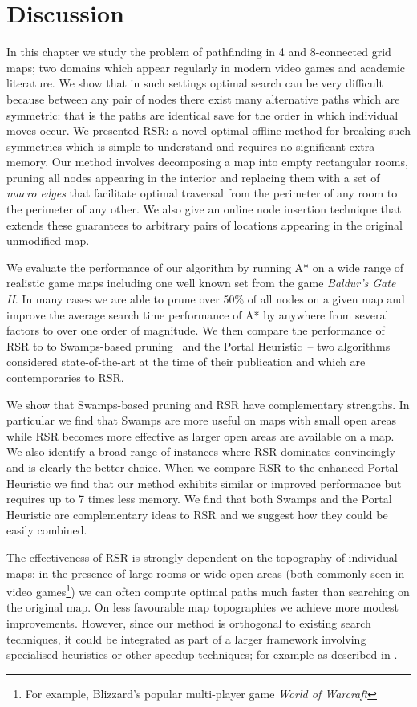 \section{Discussion}
\label{cha::rsr::discussion}
In this chapter we study the problem of pathfinding in 4 and 8-connected grid
maps; two domains which appear regularly in modern video games and academic
literature.  We show that in such settings optimal search can be very
difficult because between any pair of nodes there exist many alternative paths
which are symmetric: that is the paths are identical save for the order in
which individual moves occur.  We presented RSR: a novel optimal offline
method for breaking such symmetries which is simple to understand and requires
no significant extra memory.  Our method involves decomposing a map into empty
rectangular rooms, pruning all nodes appearing in the interior and replacing
them with a set of \emph{macro edges} that facilitate optimal traversal from
the perimeter of any room to the perimeter of any other.  We also give an
online node insertion technique that extends these guarantees
 to arbitrary pairs of locations appearing in the original unmodified map.
\par
We evaluate the performance of our algorithm by running A* on a wide range of
realistic game maps including one well known set from the game \emph{Baldur's
Gate II}.  In many cases we are able to prune over 50\% of all nodes on a
given map and improve the average search time performance of A* by anywhere
from several factors to over one order of magnitude.  We then compare the
performance of RSR to to Swamps-based pruning~\citep{pochter09,pochter11} and
the Portal Heuristic~\citep{goldenberg10}-- two algorithms considered
state-of-the-art at the time of their publication and which are contemporaries
to RSR.

We show that Swamps-based pruning and RSR  have complementary strengths. In
particular we find that Swamps are more useful on maps with small open areas
while RSR becomes more effective as larger open areas are available on a map.
We also identify a broad range of instances where RSR dominates convincingly
and is clearly the better choice.  When we compare RSR to the enhanced Portal
Heuristic we find that our method exhibits similar or improved performance but
requires up to 7 times less memory.  We find that both Swamps and the Portal
Heuristic are complementary ideas to RSR and we suggest how they could be
easily combined.
\par
The effectiveness of RSR is strongly dependent on the topography of individual
maps: in the presence of large rooms or wide open areas (both commonly seen in
video games\footnote{For example, Blizzard's popular multi-player game
\emph{World of Warcraft}}) we can often compute optimal paths much faster than
searching on the original map.  On less favourable map topographies we achieve
more modest improvements.  However, since our method is orthogonal to existing
search techniques, it could be integrated as part of a larger framework
involving specialised heuristics or other speedup techniques; for example as
described in \citep{botea04,bjornsson05,bjornsson06}.
